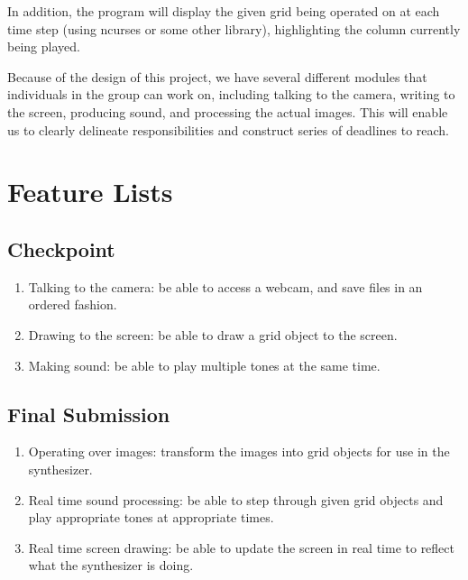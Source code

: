 \documentclass{article}
\begin{document}
In addition, the program will display the given grid being
operated on at each time step (using ncurses or some other
library), highlighting the column currently being played.

Because of the design of this project, we have several different
modules that individuals in the group can work on, including
talking to the camera, writing to the screen, producing sound, and
processing the actual images. This will enable us to clearly
delineate responsibilities and construct series of deadlines to
reach.


\section{Feature Lists} %
\label{sec:feature_lists}

\subsection{Checkpoint} %
\label{sub:checkpoint}

\begin{enumerate}

\item Talking to the camera: be able to access a webcam, and save
files in an ordered fashion.

\item Drawing to the screen: be able to draw a grid object to the
screen.

\item Making sound: be able to play multiple tones at the same
time.

\end{enumerate}


\subsection{Final Submission} %
\label{sub:final_submission}

\begin{enumerate}

\item Operating over images: transform the images into grid
objects for use in the synthesizer.

\item Real time sound processing: be able to step through given
grid objects and play appropriate tones at appropriate times.

\item Real time screen drawing: be able to update the screen in
real time to reflect what the synthesizer is doing.

\end{enumerate}
\end{document}
